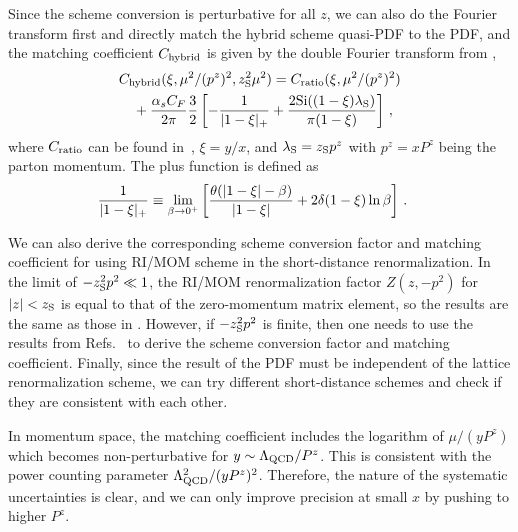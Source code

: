 Since the scheme conversion is perturbative for all $z$, we can also do the Fourier transform first and directly match the hybrid scheme quasi-PDF to the PDF, and the matching coefficient $C_{\rm hybrid}$ is given by the double Fourier transform from ,
\begin{align}\label{eq:hybridm2}
&C_{\rm hybrid}(\xi, \mu^2/(p^z)^2, z_{\rm S}^2\mu^2) = C_{\rm ratio}(\xi, \mu^2/(p^z)^2) \nonumber\\
&\quad+{\alpha_sC_F\over 2\pi}{3\over 2} \left[-{1\over |1-\xi|_+}+ \frac{2 \text{Si}((1-\xi) \lambda_{\rm S})}{\pi  (1-\xi)} \right]\,,
\end{align}
where $C_{\rm ratio}$ can be found in~\cite{Izubuchi:2018srq}, $\xi=y/x$, and $\lambda_{\rm S}=z_{\rm S}p^z$ with $p^z=xP^z$ being the parton momentum. The plus function is defined as
\begin{align}
	{1\over |1-\xi|_+} &\equiv \lim_{\beta\to0^+}\left[ {\theta(|1-\xi|-\beta)\over |1-\xi|} + 2\delta(1-\xi)\ln\beta\right] \,.
\end{align}

We can also derive the corresponding scheme conversion factor and matching coefficient for using RI/MOM scheme in the short-distance renormalization. In the limit of $-z^2_{\rm S}p^2 \ll 1$, the RI/MOM renormalization factor $Z(z,-p^2)$ for $|z|<z_{\rm S}$ is equal to that of the zero-momentum matrix element, so the results are the same as those in . However, if $-z^2_{\rm S}p^2$ is finite, then one needs to use the results from Refs.~\cite{Constantinou:2017sej,Stewart:2017tvs} to derive the scheme conversion factor and matching coefficient.
Finally, since the result of the PDF must be independent of the lattice renormalization scheme, we can try different short-distance schemes and check if they are consistent with each other.

In momentum space, the matching coefficient includes the logarithm of $\mu/(yP^z)$ which becomes non-perturbative for $y\sim \Lambda_{\rm QCD}/P^z$. This is consistent with the power counting parameter $\Lambda^2_{\rm QCD}/(yP^z)^2$. Therefore, the nature of the systematic uncertainties is clear, and we can only improve precision at
small $x$ by pushing to higher $P^z$.
